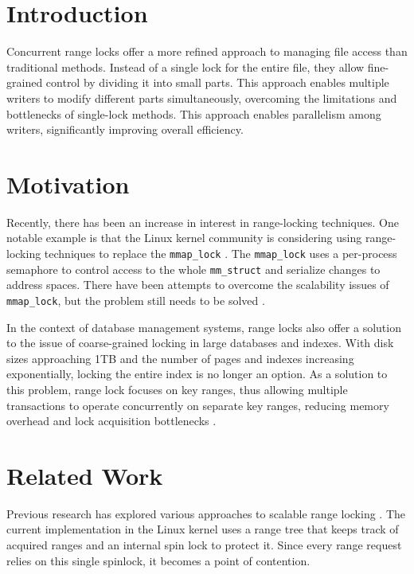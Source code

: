 \section{Introduction}

Concurrent range locks offer a more refined approach to managing file access than traditional methods. Instead of a single lock for the entire file, they allow fine-grained control by dividing it into small parts. This approach enables multiple writers to modify different parts simultaneously, overcoming the limitations and bottlenecks of single-lock methods. This approach enables parallelism among writers, significantly improving overall efficiency.

\section{Motivation}
Recently, there has been an increase in interest in range-locking techniques. One notable example is that the Linux kernel community is considering using range-locking techniques to replace the \texttt{mmap\_lock} \parencite{readerWriterLocks2017, mapleTree2021, mmapLock2022}. The \texttt{mmap\_lock} uses a per-process semaphore to control access to the whole \texttt{mm\_struct} \parencite{mmstruct2023} and serialize changes to address spaces. There have been attempts to overcome the scalability issues of \texttt{mmap\_lock}, but the problem still needs to be solved \parencite{mmapLock2022}.

In the context of database management systems, range locks also offer a solution to the issue of coarse-grained locking in large databases and indexes. With disk sizes approaching 1TB and the number of pages and indexes increasing exponentially, locking the entire index is no longer an option. As a solution to this problem, range lock focuses on key ranges, thus allowing multiple transactions to operate concurrently on separate key ranges, reducing memory overhead and lock acquisition bottlenecks \parencite{Graefe2020}.

\section{Related Work}
Previous research has explored various approaches to scalable range locking \parencite{linuxRangeLockImpl2013, migrationWM2023, scalableRangeLock2020}. The current implementation in the Linux kernel uses a range tree \parencite{linuxRangeLockImpl2013} that keeps track of acquired ranges and an internal spin lock to protect it. Since every range request relies on this single spinlock, it becomes a point of contention. 

